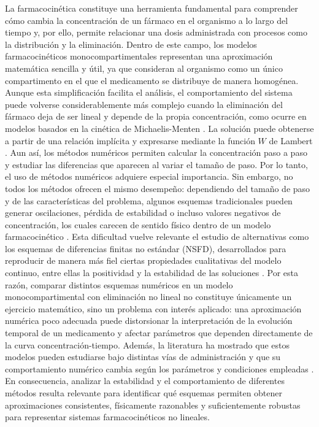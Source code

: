 \documentclass[11pt,final,5p,times,twocolumn,authoryear]{elsarticle}
\begin{document}
La farmacocinética constituye una herramienta fundamental para comprender cómo cambia la concentración de un fármaco en el organismo a lo largo del tiempo y, por ello, permite relacionar una dosis administrada con procesos como la distribución y la eliminación. Dentro de este campo, los modelos farmacocinéticos monocompartimentales representan una aproximación matemática sencilla y útil, ya que consideran al organismo como un único compartimento en el que el medicamento se distribuye de manera homogénea. Aunque esta simplificación facilita el análisis, el comportamiento del sistema puede volverse considerablemente más complejo cuando la eliminación del fármaco deja de ser lineal y depende de la propia concentración, como ocurre en modelos basados en la cinética de Michaelis-Menten \citep{tang2007}. La solución puede obtenerse a partir de una relación implícita y expresarse mediante la función $W$ de Lambert \citep{wagner1973}. Aun así, los métodos numéricos permiten calcular la concentración paso a paso y estudiar las diferencias que aparecen al variar el tamaño de paso. Por lo tanto, el uso de métodos numéricos adquiere especial importancia. Sin embargo, no todos los métodos ofrecen el mismo desempeño: dependiendo del tamaño de paso y de las características del problema, algunos esquemas tradicionales pueden generar oscilaciones, pérdida de estabilidad o incluso valores negativos de concentración, los cuales carecen de sentido físico dentro de un modelo farmacocinético \citep{egbelowo2018}. Esta dificultad vuelve relevante el estudio de alternativas como los esquemas de diferencias finitas no estándar (NSFD), desarrollados para reproducir de manera más fiel ciertas propiedades cualitativas del modelo continuo, entre ellas la positividad y la estabilidad de las soluciones \citep{mickens2002}. Por esta razón, comparar distintos esquemas numéricos en un modelo monocompartimental con eliminación no lineal no constituye únicamente un ejercicio matemático, sino un problema con interés aplicado: una aproximación numérica poco adecuada puede distorsionar la interpretación de la evolución temporal de un medicamento y afectar parámetros que dependen directamente de la curva concentración-tiempo. Además, la literatura ha mostrado que estos modelos pueden estudiarse bajo distintas vías de administración y que su comportamiento numérico cambia según los parámetros y condiciones empleadas \citep{egbelowo2017, egbelowo2018}. En consecuencia, analizar la estabilidad y el comportamiento de diferentes métodos resulta relevante para identificar qué esquemas permiten obtener aproximaciones consistentes, físicamente razonables y suficientemente robustas para representar sistemas farmacocinéticos no lineales.
\end{document}
